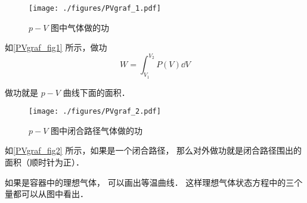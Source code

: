 
\begin{issues}
\issueDraft
\end{issues}


\begin{figure}[ht]
\centering
\texttt{[image: ./figures/PVgraf\_1.pdf]}
\caption{$p-V$ 图中气体做的功} \label{PVgraf_fig1}
\end{figure}

如\autoref{PVgraf_fig1} 所示，做功
\begin{equation}\label{PVgraf_eq1}
W = \int_{V_1}^{V_2}P(V) \dd{V}
\end{equation}

做功就是 $p-V$ 曲线下面的面积． 

\begin{figure}[ht]  
\centering
\texttt{[image: ./figures/PVgraf\_2.pdf]}
\caption{$p-V$ 图中闭合路径气体做的功} \label{PVgraf_fig2}
\end{figure}

如\autoref{PVgraf_fig2} 所示，如果是一个闭合路径， 那么对外做功就是闭合路径围出的面积（顺时针为正）．

如果是容器中的理想气体， 可以画出等温曲线． 这样理想气体状态方程中的三个量都可以从图中看出．
  